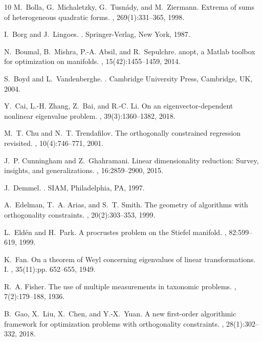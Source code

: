 \documentclass[11pt]{article}
\theoremstyle{definition}
\numberwithin{equation}{section}
\begin{document}
{\begin{thebibliography}{10}
M.~Bolla, G.~Michaletzky, G.~Tusnády, and M.~Ziermann.
\newblock Extrema of sums of heterogeneous quadratic forms.
, 269(1):331--365, 1998.

I.~Borg and J.~Lingoes.
.
\newblock Springer-Verlag, New York, 1987.

N.~Boumal, B.~Mishra, P.-A. Absil, and R.~Sepulchre.
anopt, a {M}atlab toolbox for optimization on manifolds.
, 15(42):1455--1459, 2014.

S.~Boyd and L.~Vandenberghe.
.
\newblock Cambridge University Press, Cambridge, UK, 2004.

Y.~Cai, L.-H. Zhang, Z.~Bai, and R.-C. Li.
\newblock On an eigenvector-dependent nonlinear eigenvalue problem.
, 39(3):1360--1382, 2018.

M.~T. Chu and N.~T. Trendafilov.
\newblock The orthogonally constrained regression revisited.
, 10(4):746--771, 2001.

J.~P. Cunningham and Z.~Ghahramani.
\newblock Linear dimensionality reduction: Survey, insights, and
  generalizations.
, 16:2859--2900, 2015.

J.~Demmel.
.
\newblock SIAM, Philadelphia, PA, 1997.

A.~Edelman, T.~A. Arias, and S.~T. Smith.
\newblock The geometry of algorithms with orthogonality constraints.
, 20(2):303--353, 1999.

L.~Eld\'en and H.~Park.
\newblock A procrustes problem on the {S}tiefel manifold.
, 82:599--619, 1999.

K.~Fan.
\newblock On a theorem of {W}eyl concerning eigenvalues of linear
  transformations. {I}.
, 35(11):pp. 652--655, 1949.

R.~A. Fisher.
\newblock The use of multiple measurements in taxonomic problems.
, 7(2):179--188, 1936.

B.~Gao, X.~Liu, X.~Chen, and Y.-X.~Yuan.
\newblock A new first-order algorithmic framework for optimization problems
  with orthogonality constraints.
, 28(1):302--332, 2018.


\end{thebibliography}}
\end{document}

